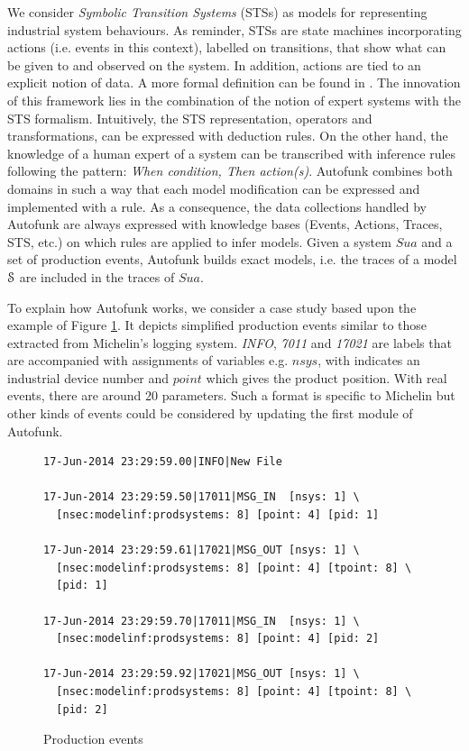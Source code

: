 We consider \textit{Symbolic Transition Systems} (STSs) as models
for representing industrial system behaviours. As reminder, STSs
are state machines incorporating actions (i.e. events in this
context), labelled on transitions, that show what can be given to
and observed on the system. In addition, actions are tied to an
explicit notion of data. A more formal definition can be found
in .
The innovation of this framework lies in
the combination of the notion of expert systems with the STS
formalism. Intuitively, the STS representation, operators and
transformations, can be expressed with deduction rules. On the
other hand, the knowledge of a human expert of a system can be
transcribed with inference rules following the pattern:
\textit{When condition, Then action(s)}. Autofunk combines both
domains in such a way that each model modification can be
expressed and implemented with a rule. As a consequence, the data
collections handled by Autofunk are always expressed with
knowledge bases (Events, Actions, Traces, STS, etc.) on which
rules are applied to infer models. Given a system $Sua$ and a set
of production events, Autofunk builds exact models, i.e. the
traces of a model $\EuScript{S}$ are included in the traces of
$Sua$.

To explain how Autofunk works, we consider a case study based
upon the example of Figure \ref{fig:rawdatum}. It depicts
simplified production events similar to those extracted from
Michelin's logging system. \textit{INFO}, \textit{7011} and
\textit{17021} are labels that are accompanied with assignments
of variables e.g. $nsys$, with indicates an industrial device
number and $point$ which gives the product position. With real
events, there are around 20 parameters. Such a format is specific
to Michelin but other kinds of events could be considered by
updating the first module of Autofunk.

\begin{figure}[ht]
\begin{framed}
\begin{BVerbatim}
17-Jun-2014 23:29:59.00|INFO|New File

17-Jun-2014 23:29:59.50|17011|MSG_IN  [nsys: 1] \
  [nsec:modelinf:prodsystems: 8] [point: 4] [pid: 1]

17-Jun-2014 23:29:59.61|17021|MSG_OUT [nsys: 1] \
  [nsec:modelinf:prodsystems: 8] [point: 4] [tpoint: 8] \
  [pid: 1]

17-Jun-2014 23:29:59.70|17011|MSG_IN  [nsys: 1] \
  [nsec:modelinf:prodsystems: 8] [point: 4] [pid: 2]

17-Jun-2014 23:29:59.92|17021|MSG_OUT [nsys: 1] \
  [nsec:modelinf:prodsystems: 8] [point: 4] [tpoint: 8] \
  [pid: 2]
\end{BVerbatim}
\end{framed}

\caption{Production events}
\label{fig:rawdatum}
\end{figure}

